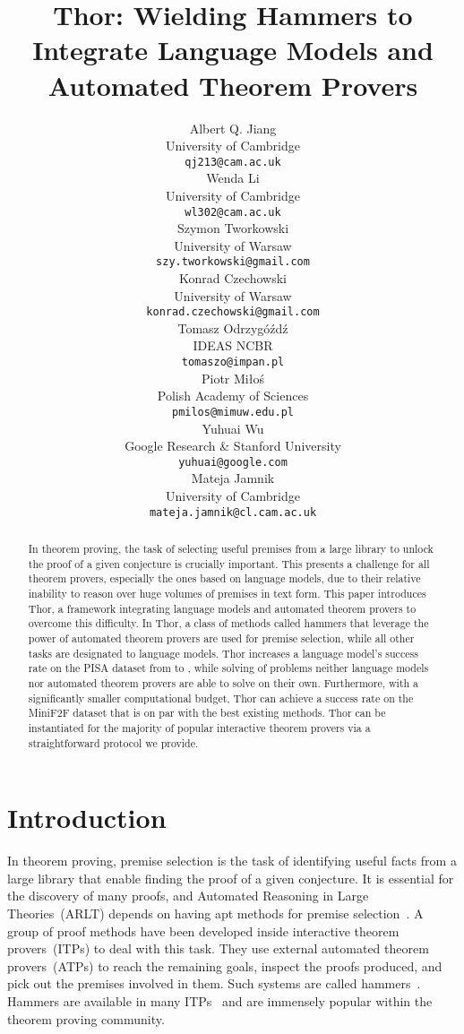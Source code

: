 \documentclass{article}
\title{Thor: Wielding Hammers to Integrate Language Models and Automated Theorem Provers}
\author{Albert Q. Jiang \\
  University of Cambridge\\
  \texttt{qj213@cam.ac.uk} \\
  \And
  Wenda Li \\
  University of Cambridge\\
  \texttt{wl302@cam.ac.uk} \\
  \And
  Szymon Tworkowski \\
  University of Warsaw \\
  \texttt{szy.tworkowski@gmail.com} \\
  \And
  Konrad Czechowski \\
  University of Warsaw \\
  \texttt{konrad.czechowski@gmail.com} \\
  \And
  Tomasz Odrzygóźdź \\
  IDEAS NCBR \\
  \texttt{tomaszo@impan.pl} \\
  \And
  Piotr Miłoś \\
  Polish Academy of Sciences \\
  \texttt{pmilos@mimuw.edu.pl} \\
  \And
  Yuhuai Wu \\
  Google Research \& Stanford University \\
  \texttt{yuhuai@google.com} \\
  \And
  Mateja Jamnik \\
  University of Cambridge\\
  \texttt{mateja.jamnik@cl.cam.ac.uk} \\
}
\begin{document}
\maketitle

\begin{abstract}
In theorem proving, the task of selecting useful premises from a large library to unlock the proof of a given conjecture is crucially important. This presents a challenge for all theorem provers, especially the ones based on language models, due to their relative inability to reason over huge volumes of premises in text form. This paper introduces Thor, a framework integrating language models and automated theorem provers to overcome this difficulty. In Thor, a class of methods called hammers that leverage the power of automated theorem provers are used for premise selection, while all other tasks are designated to language models. Thor increases a language model's success rate on the PISA dataset from  to , while solving  of problems neither language models nor automated theorem provers are able to solve on their own. Furthermore, with a significantly smaller computational budget, Thor can achieve a success rate on the MiniF2F dataset that is on par with the best existing methods. Thor can be instantiated for the majority of popular interactive theorem provers via a straightforward protocol we provide.

\end{abstract}




\section{Introduction}
\label{sec: intro}







In theorem proving, premise selection is the task of identifying useful facts from a large library that enable finding the proof of a given conjecture. It is essential for the discovery of many proofs, and Automated Reasoning in Large Theories~(ARLT) depends on having apt methods for premise selection~\citep{arlt1, arlt2}. A group of proof methods have been developed inside interactive theorem provers~(ITPs) to deal with this task. They use external automated theorem provers~(ATPs) to reach the remaining goals, inspect the proofs produced, and pick out the premises involved in them. Such systems are called hammers~\citep{blanchette2016hammering}. Hammers are available in many ITPs~\citep{paulson2010three, holyhammer, hol4hammer, coqhammer} and are immensely popular within the theorem proving community. 
\end{document}
